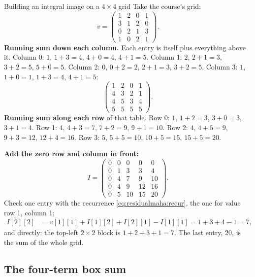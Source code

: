 \begin{worked}[label={we:residualmaha:integral}]{Building an integral image on a $4\times4$ grid}
Take the course's grid:
\[
v=\begin{pmatrix}1&2&0&1\\3&1&2&0\\0&2&1&3\\1&0&2&1\end{pmatrix}.
\]
\textbf{Running sum down each column.} Each entry is itself plus everything above it. Column 0: $1$, $1+3=4$,
$4+0=4$, $4+1=5$. Column 1: $2$, $2+1=3$, $3+2=5$, $5+0=5$. Column 2: $0$, $0+2=2$, $2+1=3$, $3+2=5$.
Column 3: $1$, $1+0=1$, $1+3=4$, $4+1=5$:
\[
\begin{pmatrix}1&2&0&1\\4&3&2&1\\4&5&3&4\\5&5&5&5\end{pmatrix}.
\]
\textbf{Running sum along each row} of that table. Row 0: $1$, $1+2=3$, $3+0=3$, $3+1=4$. Row 1: $4$,
$4+3=7$, $7+2=9$, $9+1=10$. Row 2: $4$, $4+5=9$, $9+3=12$, $12+4=16$. Row 3: $5$, $5+5=10$, $10+5=15$,
$15+5=20$.

\textbf{Add the zero row and column in front:}
\[
I=\begin{pmatrix}0&0&0&0&0\\0&1&3&3&4\\0&4&7&9&10\\0&4&9&12&16\\0&5&10&15&20\end{pmatrix}.
\]
Check one entry with the recurrence \eqref{eq:residualmaha:recur}, the one for value row 1, column 1:
\begin{align*}
I[2][2] &= v[1][1]+I[1][2]+I[2][1]-I[1][1] = 1+3+4-1 = 7,
\end{align*}
and directly: the top-left $2\times2$ block is $1+2+3+1=7$. The last entry, 20, is the sum of the whole grid.
\end{worked}

\subsection{The four-term box sum}

